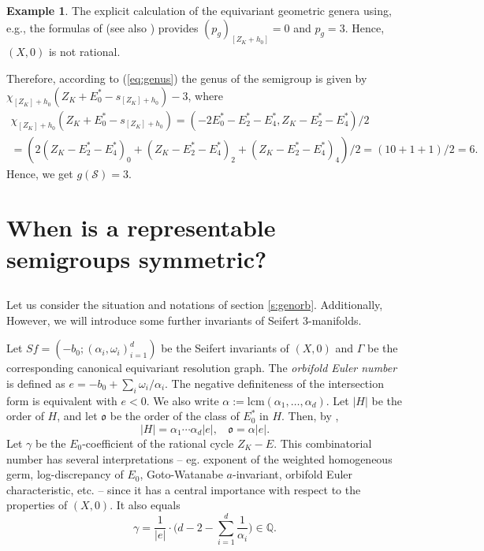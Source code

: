 \documentclass[12pt,a4paper]{amsart}
\def\cS{{\mathcal S}}
\theoremstyle{remark}
\theoremstyle{definition}
\newtheorem{exam}{Example}[section]
\begin{document}
\begin{exam}
The explicit calculation of the equivariant geometric genera using, e.g., the formulas of \cite[sect. 6]{LN14} (see also \cite[pg. 241]{nbook}) provides $(p_g)_{[Z_K+h_0]}=0$ and $p_g=3$. Hence, $(X,0)$ is not rational. 

Therefore, according to (\ref{eq:genus}) the genus of the semigroup is given by $\chi_{[Z_K]+h_0}(Z_K+E_0^*-s_{[Z_K]+h_0})-3$, where 
\begin{multline*}
\chi_{[Z_K]+h_0}(Z_K+E_0^*-s_{[Z_K]+h_0})=(-2E_0^*-E_2^*-E_4^*,Z_K-E_2^*-E_4^*)/2\\
=(2(Z_K-E_2^*-E_4^*)_0+(Z_K-E_2^*-E_4^*)_2+(Z_K-E_2^*-E_4^*)_4)/2=(10+1+1)/2=6. 
\end{multline*}
Hence, we get $g(\cS)=3$.
\end{exam}

\section{When is a representable semigroups symmetric?}

\subsection{} 
Let us consider the situation and  notations of section \ref{s:genorb}. Additionally, 
However, we will  introduce some further invariants of Seifert 3-manifolds. 


Let $Sf=(-b_0;(\alpha_i,\omega_i)_{i=1}^d)$ be the Seifert invariants of $(X,0)$ and $\Gamma$ be the corresponding canonical equivariant resolution graph. The {\it orbifold Euler number}
is defined as $e=-b_0+\sum_i\omega_i/\alpha_i$. The negative definiteness of the intersection form is equivalent with  $e<0$. We also write  $\alpha:=\mathrm{lcm}(\alpha_1,\ldots,\alpha_d)$. Let $|H|$ be the order of $H$, and
let  $\mathfrak{o}$ be the order of the class of $E^*_0$ in $H$. 
Then, by \cite{neumann.abel}, 
\begin{equation}\label{eq:sei2}
 |H|=\alpha_1\cdots\alpha_d|e|, \ \ \ \ \mathfrak{o}=\alpha|e|.
\end{equation}
Let $\gamma$ be the $E_0$-coefficient of the rational cycle $Z_K-E$. This combinatorial number has several interpretations -- eg. exponent of the weighted homogeneous germ, log-discrepancy of $E_0$, Goto-Watanabe $a$-invariant, orbifold Euler characteristic, etc. -- since it has a central importance with respect to the properties of $(X,0)$. It also equals 
$$\gamma=\frac{1}{|e|}\cdot \Big( d-2-\sum_{i=1}^d \frac{1}{\alpha_i}\Big)\in \mathbb{Q}.$$
\end{document}
